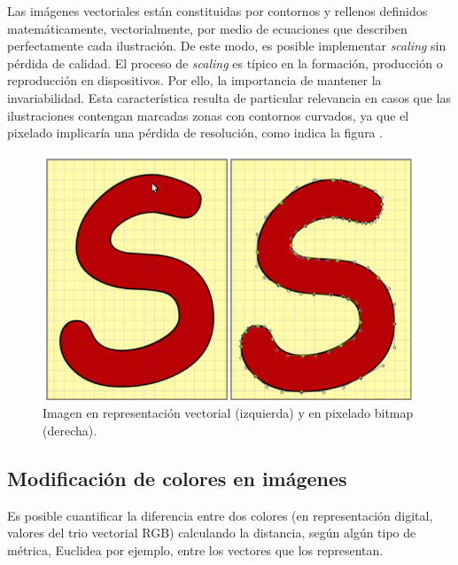 Las im\'agenes vectoriales est\'an constituidas por contornos y rellenos definidos matem\'aticamente, vectorialmente,  por medio de ecuaciones que 
describen perfectamente cada ilustraci\'on. 
%
De este modo, es posible implementar \textit{scaling} sin p\'erdida de calidad.
%
El proceso de \textit{scaling} es t\'ipico en la formaci\'on, producci\'on o reproducci\'on en dispositivos. Por ello, la importancia de mantener la 
invariabilidad. 
%
Esta caracter\'istica resulta de particular relevancia en casos que las ilustraciones contengan marcadas zonas con contornos curvados, ya que el pixelado 
implicar\'ia una p\'erdida de resoluci\'on, como indica la figura .

%

\begin{center}
\begin{figure} [!h]

\centering
\includegraphics[width=12cm]{Figuras/Fig2_1.png}
   
\caption{Imagen en representaci\'on vectorial (izquierda) y en pixelado bitmap (derecha).}
\label{Fig2_1}

\end{figure}
\end{center}



\subsection{Modificaci\'on de colores en im\'agenes}


Es posible cuantificar la diferencia entre dos colores (en representaci\'on digital, valores del trio vectorial RGB) calculando la distancia, seg\'un alg\'un 
tipo de m\'etrica, Euclidea por ejemplo, entre los vectores que los representan.
%

